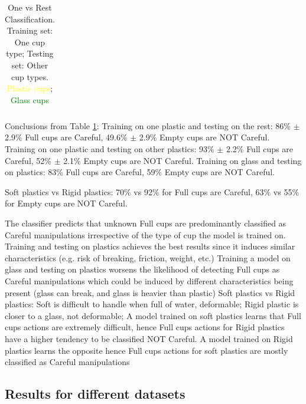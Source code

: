 \begin{table}
\begin{tabular}{l l c c c c c c}
\bottomrule %
\end{tabular}
\caption{One vs Rest Classification. Training set: One cup type; Testing set: Other cup types. \textcolor{Yellow}{Plastic cups}; \textcolor{Green}{Glass cups}}
\label{tab:one_vs_all} 
\end{table}

Conclusions from Table \ref{tab:one_vs_all}:
Training on one plastic and testing on the rest: 86\% $\pm$ 2.9\% Full cups are Careful, 49.6\% $\pm$ 2.9\% Empty cups are NOT Careful. Training on one plastic and testing on other plastics: 93\% $\pm$ 2.2\% Full cups are Careful, 52\% $\pm$ 2.1\% Empty cups are NOT Careful. Training on glass and testing on plastics: 83\% Full cups are Careful,	59\% Empty cups are NOT Careful.

Soft plastics vs Rigid plastics: 70\% vs 92\% for Full cups are Careful, 63\% vs 55\% for Empty cups are NOT Careful. 

The classifier predicts that unknown Full cups are predominantly classified as Careful manipulations irrespective of the type of cup the model is trained on.
Training and testing on plastics achieves the best results since it induces similar characteristics (e.g. risk of breaking, friction, weight, etc.) 
Training a model on glass and testing on plastics worsens the likelihood of detecting Full cups as Careful manipulations which could be induced by different characteristics being present (glass can break, and glass is heavier than plastic)
Soft plastics vs Rigid plastics: 		
Soft is difficult to handle when full of water, deformable;
Rigid plastic is closer to a glass, not deformable; 
A model trained on soft plastics learns that Full cups actions are extremely difficult, hence Full cups actions for Rigid plastics have a higher tendency to be classified NOT Careful.
A model trained on Rigid plastics learns the opposite hence Full cups actions for soft plastics are mostly classified as Careful manipulations

\subsection{Results for different datasets}


